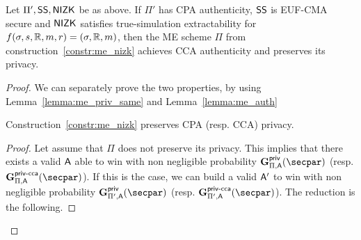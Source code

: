 \begin{theorem}\label{theo:me_nizk_auth}
    Let $\Pi', \mathsf{SS}, \mathsf{NIZK}$ be as above.
    If $\Pi'$ has CPA authenticity, $\mathsf{SS}$ is EUF-CMA secure and $\mathsf{NIZK}$ satisfies true-simulation extractability for $f(\sigma, s, \mathbb{R}, m, r) = (\sigma, \mathbb{R}, m)$, then the ME scheme $\Pi$ from construction~\ref{constr:me_nizk} achieves CCA authenticity and preserves its privacy.
\end{theorem}

\begin{proof}
    We can separately prove the two properties, by using Lemma~\ref{lemma:me_priv_same} and Lemma~\ref{lemma:me_auth}

    \begin{lemma}\label{lemma:me_priv_same}
        Construction~\ref{constr:me_nizk} preserves CPA (resp. CCA) privacy.
        \begin{proof}
            Let assume that $\Pi$ does not preserve its privacy.
            This implies that there exists a valid $\mathsf{A}$ able to win with non negligible probability $\NISHmatchgame{}_{\Pi, \adversary}(\secpar)$ (resp. $\NISHmatchgamecca{}_{\Pi, \adversary}(\secpar)$).
            If this is the case, we can build a valid $\mathsf{A}'$ to win with non negligible probability $\NISHmatchgame{}_{\Pi', \adversary}(\secpar)$ (resp. $\NISHmatchgamecca{}_{\Pi', \adversary}(\secpar)$).
            The reduction is the following.


\end{proof}
\end{lemma}
\end{proof}
